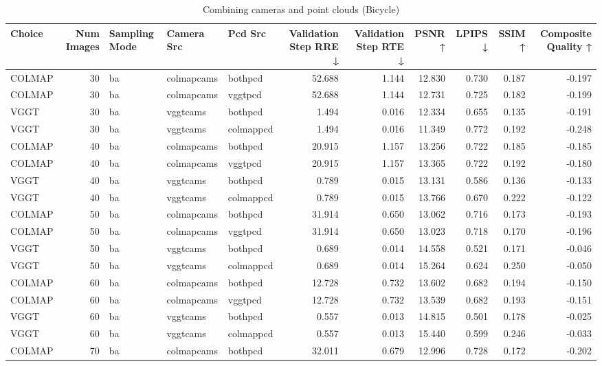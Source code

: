\begin{table}[H]
\caption{Combining cameras and point clouds (Bicycle)}
\label{tab:11_combined_bicycle}
\begin{tabular}{lrlllrrrrrr}
\toprule
Choice & Num Images & Sampling Mode & Camera Src & Pcd Src & Validation Step RRE ↓ & Validation Step RTE ↓ & PSNR ↑ & LPIPS ↓ & SSIM ↑ & Composite Quality ↑ \\
\midrule
COLMAP & 30 & ba & colmapcams & bothpcd & 52.688 & 1.144 & 12.830 & 0.730 & 0.187 & -0.197 \\
COLMAP & 30 & ba & colmapcams & vggtpcd & 52.688 & 1.144 & 12.731 & 0.725 & 0.182 & -0.199 \\
VGGT & 30 & ba & vggtcams & bothpcd & 1.494 & 0.016 & 12.334 & 0.655 & 0.135 & -0.191 \\
VGGT & 30 & ba & vggtcams & colmappcd & 1.494 & 0.016 & 11.349 & 0.772 & 0.192 & -0.248 \\
COLMAP & 40 & ba & colmapcams & bothpcd & 20.915 & 1.157 & 13.256 & 0.722 & 0.185 & -0.185 \\
COLMAP & 40 & ba & colmapcams & vggtpcd & 20.915 & 1.157 & 13.365 & 0.722 & 0.192 & -0.180 \\
VGGT & 40 & ba & vggtcams & bothpcd & 0.789 & 0.015 & 13.131 & 0.586 & 0.136 & -0.133 \\
VGGT & 40 & ba & vggtcams & colmappcd & 0.789 & 0.015 & 13.766 & 0.670 & 0.222 & -0.122 \\
COLMAP & 50 & ba & colmapcams & bothpcd & 31.914 & 0.650 & 13.062 & 0.716 & 0.173 & -0.193 \\
COLMAP & 50 & ba & colmapcams & vggtpcd & 31.914 & 0.650 & 13.023 & 0.718 & 0.170 & -0.196 \\
VGGT & 50 & ba & vggtcams & bothpcd & 0.689 & 0.014 & 14.558 & 0.521 & 0.171 & -0.046 \\
VGGT & 50 & ba & vggtcams & colmappcd & 0.689 & 0.014 & 15.264 & 0.624 & 0.250 & -0.050 \\
COLMAP & 60 & ba & colmapcams & bothpcd & 12.728 & 0.732 & 13.602 & 0.682 & 0.194 & -0.150 \\
COLMAP & 60 & ba & colmapcams & vggtpcd & 12.728 & 0.732 & 13.539 & 0.682 & 0.193 & -0.151 \\
VGGT & 60 & ba & vggtcams & bothpcd & 0.557 & 0.013 & 14.815 & 0.501 & 0.178 & -0.025 \\
VGGT & 60 & ba & vggtcams & colmappcd & 0.557 & 0.013 & 15.440 & 0.599 & 0.246 & -0.033 \\
COLMAP & 70 & ba & colmapcams & bothpcd & 32.011 & 0.679 & 12.996 & 0.728 & 0.172 & -0.202 \\

\end{tabular}
\end{table}
